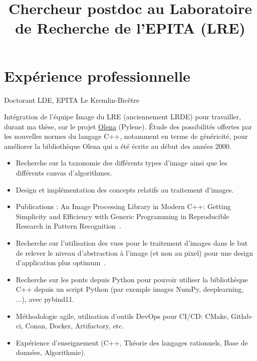 \documentclass[11pt,a4paper,sans]{moderncv} %
\title{Chercheur postdoc au Laboratoire de Recherche de l'EPITA (LRE)}
\begin{document}
\makecvtitle %


\section{Expérience professionnelle}

{Doctorant}
{LDE, EPITA}
{Le Kremlin-Bicêtre}
{}
{Intégration de l’équipe Image du LRE (anciennement LRDE) pour travailler, durant ma thèse, sur le projet \href{https://www.lre.epita.fr/wiki/Olena}{Olena} (Pylene). \'Etude des possibilités offertes par les nouvelles normes du langage C++, notamment en terme de généricité, pour améliorer la bibliothèque Olena qui a été écrite au début des années 2000.
	\begin{itemize}
		\item Recherche sur la taxonomie des différents types d'image ainsi que les différents canvas d'algorithmes.
		\item Design et implémentation des concepts relatifs au traitement d'images.
		\item Publications : An Image Processing Library in Modern C++: Getting Simplicity and Efficiency with Generic Programming in Reproducible Research in Pattern Recognition~\cite{roynard.2019.rrpr}.
		\item Recherche sur l'utilisation des vues pour le traitement d'images dans le but de relever le niveau d'abstraction à l'image (et non au pixel) pour une design d'application plus optimum~\cite{roynard.2022.gpce}.
		\item Recherche sur les ponts depuis Python pour pouvoir utiliser la bibliothèque C++ depuis un script Python (par exemple images NumPy, deeplearning, ...), avec pybind11.
		\item Méthodologie agile, utilisation d'outils DevOps pour CI/CD: CMake, Gitlab-ci, Conan, Docker, Artifactory, etc.
		\item Expérience d'enseignement (C++, Théorie des langages rationnels, Base de données, Algorithmie).
	\end{itemize}
}
\end{document}
